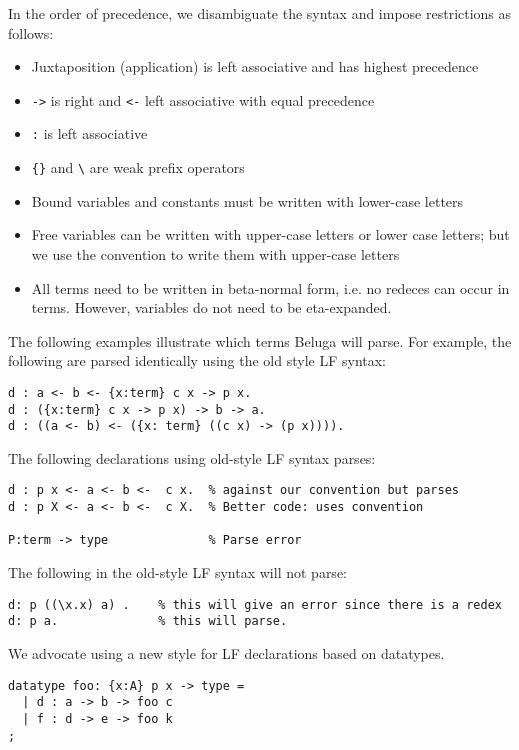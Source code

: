 \documentclass[11pt]{article}
\begin{document}
In the order of precedence, we disambiguate the syntax and impose restrictions as follows:
\begin{itemize}
\item Juxtaposition (application) is left associative and has highest precedence
\item\lstinline!->! is right and \lstinline!<-! left associative with equal precedence
\item\lstinline!:! is left associative
\item\lstinline!{}! and \lstinline!\! are weak prefix operators
\item Bound variables and constants must be written with lower-case letters
\item Free variables can be written with upper-case letters or lower case letters; but we use the convention to write them with upper-case letters
\item All terms need to be written in beta-normal form, i.e. no redeces can occur in terms. However, variables do not need to be eta-expanded.
\end{itemize}
The following examples illustrate which terms Beluga will parse. For example, the following are parsed identically using the old style LF syntax:

\begin{verbatim}
d : a <- b <- {x:term} c x -> p x.
d : ({x:term} c x -> p x) -> b -> a.
d : ((a <- b) <- ({x: term} ((c x) -> (p x)))).
\end{verbatim}


The following declarations using old-style LF syntax parses:
\begin{verbatim}
d : p x <- a <- b <-  c x.  % against our convention but parses
d : p X <- a <- b <-  c X.  % Better code: uses convention

P:term -> type              % Parse error
\end{verbatim}


The following in the old-style LF syntax will not parse:
\begin{verbatim}
d: p ((\x.x) a) .    % this will give an error since there is a redex
d: p a.              % this will parse.
\end{verbatim}


We advocate using a new style for LF declarations based on datatypes.

\begin{verbatim}
datatype foo: {x:A} p x -> type =
  | d : a -> b -> foo c
  | f : d -> e -> foo k
;
\end{verbatim}
\end{document}
